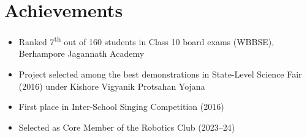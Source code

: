 \documentclass[a4paper,10pt]{article}
\begin{document}
\section*{Achievements}
\enlargethispage{2\baselineskip}

\begin{itemize}
    \item Ranked 7\textsuperscript{th} out of 160 students in Class 10 board exams (WBBSE), Berhampore Jagannath Academy
    \item Project selected among the best demonstrations in State-Level Science Fair (2016) under Kishore Vigyanik Protsahan Yojana
    \item First place in Inter-School Singing Competition (2016)
    \item Selected as Core Member of the Robotics Club (2023–24)
\end{itemize}
\end{document}
